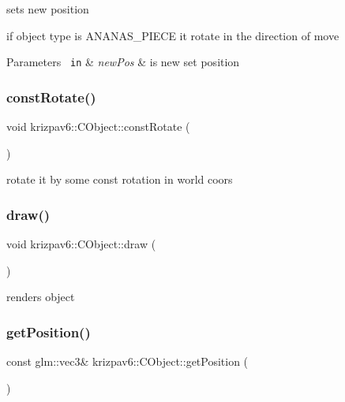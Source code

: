 sets new position 

if object type is A\+N\+A\+N\+A\+S\+\_\+\+P\+I\+E\+CE it rotate in the direction of move 
\begin{DoxyParams}[1]{Parameters}
\mbox{\texttt{ in}}  & {\em new\+Pos} & is new set position \\
\hline
\end{DoxyParams}
\mbox{\label{classkrizpav6_1_1_c_object_a11da6dc7d2bcbd967ea2cd1cd02a06cc}} 
\subsubsection{\texorpdfstring{constRotate()}{constRotate()}}
{\footnotesize\ttfamily void krizpav6\+::\+C\+Object\+::const\+Rotate (\begin{DoxyParamCaption}{ }\end{DoxyParamCaption})\hspace{0.3cm}{\ttfamily [inline]}}



rotate it by some const rotation in world coors 

\mbox{\label{classkrizpav6_1_1_c_object_aad40c775a0dda47f425bcc38235019a0}} 
\subsubsection{\texorpdfstring{draw()}{draw()}}
{\footnotesize\ttfamily void krizpav6\+::\+C\+Object\+::draw (\begin{DoxyParamCaption}{ }\end{DoxyParamCaption})}



renders object 

\mbox{\label{classkrizpav6_1_1_c_object_a1586d4e3d355cb0aad673782b759bfb1}} 
\subsubsection{\texorpdfstring{getPosition()}{getPosition()}}
{\footnotesize\ttfamily const glm\+::vec3\& krizpav6\+::\+C\+Object\+::get\+Position (\begin{DoxyParamCaption}{ }\end{DoxyParamCaption})\hspace{0.3cm}{\ttfamily [inline]}}




